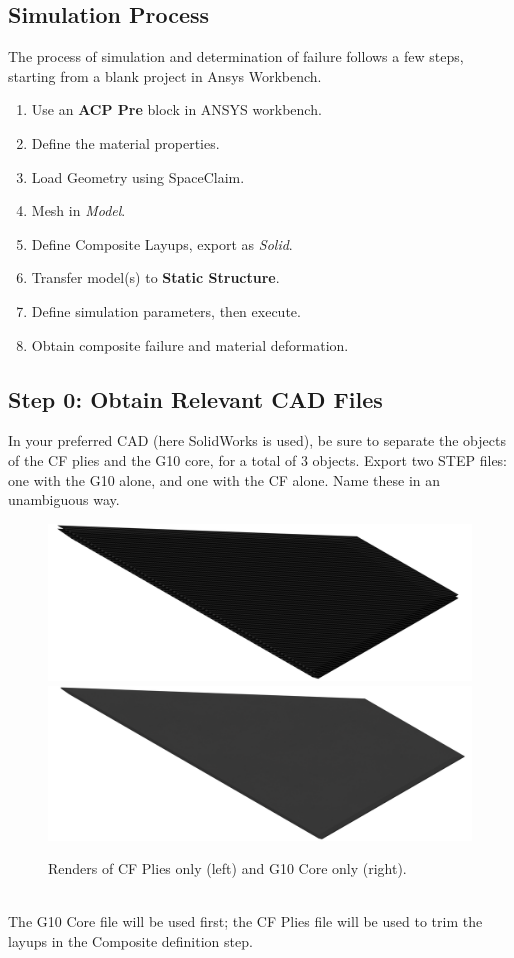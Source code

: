\documentclass{amsdtx}
\begin{document}
\subsection{Simulation Process}
The process of simulation and determination of failure follows a few steps, starting from a blank project in Ansys Workbench.
\begin{multicols}{2}
\begin{enumerate}
	\item Use an \textbf{ACP Pre} block in ANSYS workbench.
	\item Define the material properties.
	\item Load Geometry using SpaceClaim.
	\item Mesh in \textit{Model}.
	\item Define Composite Layups, export as \textit{Solid}.
	\item Transfer model(s) to \textbf{Static Structure}.
	\item Define simulation parameters, then execute.
	\item Obtain composite failure and material deformation.
\end{enumerate}
\end{multicols}
\newpage
\subsection{Step 0: Obtain Relevant CAD Files}
In your preferred CAD (here SolidWorks is used), be sure to separate the objects of the CF plies and the G10 core, for a total of 3 objects. Export two STEP files: one with the G10 alone, and one with the CF alone. Name these in an unambiguous way.\\
\begin{figure}[H]
\centering
\includegraphics[scale=0.11]{CFonly.png}	\kern-1cm\includegraphics[scale=0.11]{G10only.png}	
\caption{Renders of CF Plies only (left) and G10 Core only (right).}
\end{figure}~\\
\noindent The G10 Core file will be used first; the CF Plies file will be used to trim the layups in the Composite definition step.\\
\end{document}
